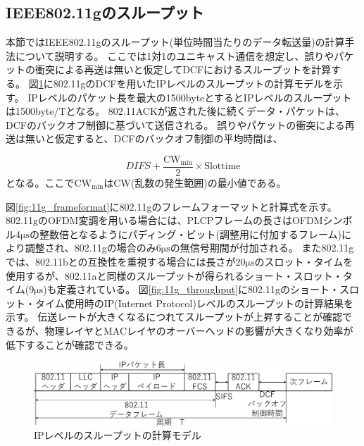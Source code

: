 \documentclass[a4paper,10.5pt]{ltjsarticle}
\begin{document}
\subsection{IEEE802.11gのスループット}
本節ではIEEE802.11gのスループット(単位時間当たりのデータ転送量)の計算手法について説明する。
ここでは1対1のユニキャスト通信を想定し、誤りやパケットの衝突による再送は無いと仮定してDCFにおけるスループットを計算する。
図\ref{fig:11g_packet}に802.11gのDCFを用いたIPレベルのスループットの計算モデルを示す。
IPレベルのパケット長を最大の1500byteとするとIPレベルのスループットは1500byte/Tとなる。
802.11ACKが返された後に続くデータ・パケットは、DCFのバックオフ制御に基づいて送信される。
誤りやパケットの衝突による再送は無いと仮定すると、DCFのバックオフ制御の平均時間は、

\begin{equation}
   DIFS+\frac{\mathrm{CW_{min}}}{2} \times \text{Slottime}
\end{equation}
となる。ここで$\mathrm{CW_{min}}$は$\mathrm{CW}$(乱数の発生範囲)の最小値である。

図\ref{fig:11g_frameformat}に802.11gのフレームフォーマットと計算式を示す。
802.11gのOFDM変調を用いる場合には、PLCPフレームの長さはOFDMシンボル4$\mathrm{\mu{s}}$の整数倍となるようにパディング・ビット(調整用に付加するフレーム)により調整され、802.11gの場合のみ6$\mathrm{\mu{s}}$の無信号期間が付加される。
また802.11gでは、802.11bとの互換性を重視する場合には長さが20$\mathrm{\mu{s}}$のスロット・タイムを使用するが、802.11aと同様のスループットが得られるショート・スロット・タイム(9$\mathrm{\mu{s}}$)も定義されている。
図\ref{fig:11g_throughput}に802.11gのショート・スロット・タイム使用時のIP(Internet Protocol)レベルのスループットの計算結果を示す。
伝送レートが大きくなるにつれてスループットが上昇することが確認できるが、物理レイヤとMACレイヤのオーバーヘッドの影響が大きくなり効率が低下することが確認できる。


\begin{figure}[H]
  \centering
  \includegraphics[width=\linewidth]{11g_packet.pdf} %
  \caption{IPレベルのスループットの計算モデル}
  \label{fig:11g_packet} %
\end{figure}
\end{document}
